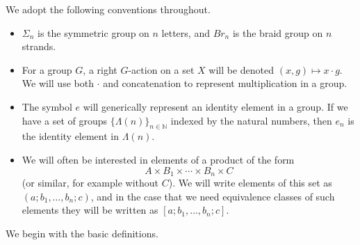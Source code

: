 \documentclass{amsbook} %
\newcommand{\N}{\mathbb{N}}
\numberwithin{section}{chapter}
\begin{document}
\begin{conv}
We adopt the following conventions throughout.
\begin{itemize}
\item $\Sigma_{n}$ is the symmetric group on $n$ letters, and $Br_{n}$ is the braid group on $n$ strands.
\item For a group $G$, a right $G$-action on a set $X$ will be denoted $(x,g) \mapsto x \cdot g$.  We will use both $\cdot$ and concatenation to represent multiplication in a group.
\item The symbol $e$ will generically represent an identity element in a group.  If we have a set of groups $\{ \Lambda(n) \}_{n \in \N}$ indexed by the natural numbers, then $e_{n}$ is the identity element in $\Lambda(n)$.
\item We will often be interested in elements of a product of the form
\[
A \times B_{1} \times \cdots \times B_{n} \times C
\]
(or similar, for example without $C$).  We will write elements of this set as $(a; b_{1}, \ldots, b_{n}; c)$, and in the case that we need equivalence classes of such elements they will be written as $[a; b_{1}, \ldots, b_{n}; c]$.
\end{itemize}
\end{conv}

We begin with the basic definitions.
\end{document}
